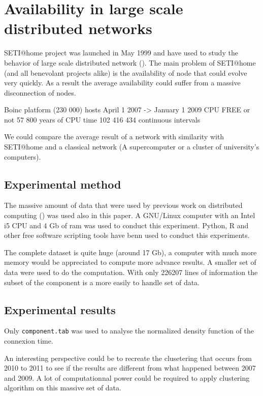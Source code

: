 \section{Availability in large scale distributed networks}

SETI@home project was launched in May 1999 and have used to study the behavior of 
large scale distributed network (\cite{ja_ko_mascots09}). The main problem of SETI@home
(and all benevolant projects alike) is the availability of node that could evolve very quickly.
As a result the average availability could suffer from a massive disconnection of nodes.

Boinc platform (230 000) hosts
April 1 2007 -> January 1 2009
CPU FREE or not
57 800 years of CPU time
102 416 434 continuous intervals

We could compare the average result of a network with similarity with SETI@home and a classical
network (A supercomputer or a cluster of university's computers).

\subsection{Experimental method}

The massive amount of data that were used by previous work on distributed computing (\cite{ja_ko_mascots09})
was used also in this paper. A GNU/Linux computer with an Intel i5 CPU and 4 Gb of ram was used to conduct this
experiment. Python, R and other free software scripting tools have benn used to conduct this experiments.

The complete dataset is quite huge (around 17 Gb), a computer with much more memory would be appreciated to
compute more advance results. A smaller set of data were used to do the computation. With only 226207 lines 
of information the subset of the component is a more easily to handle set of data.

\subsection{Experimental results}

Only \texttt{component.tab} was used to analyse the normalized density function of the connexion time.

An interesting perspective could be to recreate the clusetering that occurs from 2010 to 2011 to see if
the results are different from what happened between 2007 and 2009. A lot of computationnal power could be 
required to apply clustering algorithm on this massive set of data.

